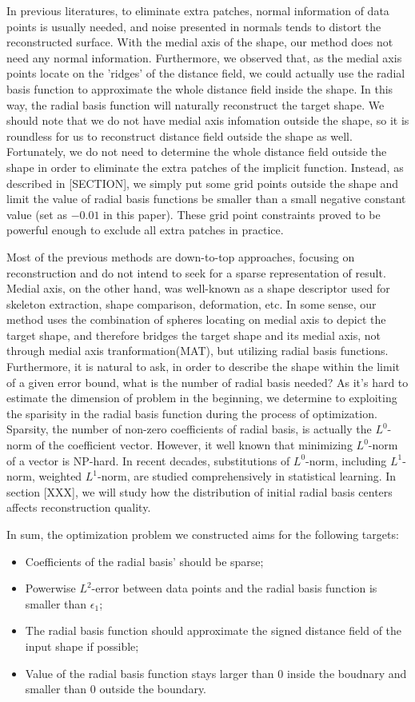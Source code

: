 \documentclass[annual]{acmsiggraph}
\begin{document}
In previous literatures, to eliminate extra patches, normal information of data points is usually needed, and noise presented in normals tends to distort the reconstructed surface. With the medial axis of the shape, our method does not need any normal information. Furthermore, we observed that, as the medial axis points locate on the 'ridges' of the distance field, we could actually use the radial basis function to approximate the whole distance field inside the shape. In this way, the radial basis function will naturally reconstruct the target shape. We should note that we do not have medial axis infomation outside the shape, so it is roundless for us to reconstruct distance field outside the shape as well. Fortunately, we do not need to determine the whole distance field outside the shape in order to eliminate the extra patches of the implicit function. Instead, as described in [SECTION], we simply put some grid points outside the shape and limit the value of radial basis functions be smaller than a small negative constant value (set as $-0.01$ in this paper). These grid point constraints proved to be powerful enough to exclude all extra patches in practice.

Most of the previous methods are down-to-top approaches, focusing on reconstruction and do not intend to seek for a sparse representation of result. Medial axis, on the other hand, was well-known as a shape descriptor used for skeleton extraction, shape comparison, deformation, etc. In some sense, our method uses the combination of spheres locating on medial axis to depict the target shape, and therefore bridges the target shape and its medial axis, not through medial axis tranformation(MAT), but utilizing radial basis functions. Furthermore, it is natural to ask, in order to describe the shape within the limit of a given error bound, what is the number of radial basis needed? As it's hard to estimate the dimension of problem in the beginning, we determine to exploiting the sparisity in the radial basis function during the process of optimization. Sparsity, the number of non-zero coefficients of radial basis, is actually the $L^0$-norm of the coefficient vector. However, it well known that minimizing $L^0$-norm of a vector is NP-hard. In recent decades, substitutions of $L^0$-norm, including $L^1$-norm, weighted $L^1$-norm, are studied comprehensively in statistical learning.  In section [XXX], we will study how the distribution of initial radial basis centers affects reconstruction quality.


In sum, the optimization problem we constructed aims for the following targets:
\begin{itemize}
\item Coefficients of the radial basis' should be sparse;
\item Powerwise $L^2$-error between data points and the radial basis function is smaller than $\epsilon_1$;
\item The radial basis function should approximate the signed distance field of the input shape if possible; 
\item Value of the radial basis function stays larger than 0 inside the boudnary and smaller than 0 outside the boundary.
\end{itemize}
\end{document}
